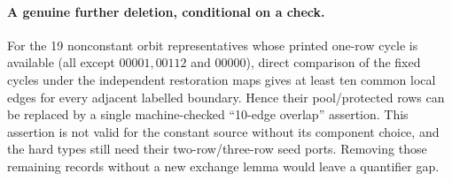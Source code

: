 \paragraph{A genuine further deletion, conditional on a check.}
For the 19 nonconstant orbit representatives whose printed one-row cycle
is available (all except $00001,00112$ and $00000$), direct comparison of
the fixed cycles under the independent restoration maps gives at least ten
common local edges for every adjacent labelled boundary.  Hence their
pool/protected rows can be replaced by a single machine-checked
``10-edge overlap'' assertion.  This assertion is not valid for the
constant source without its component choice, and the hard types still
need their two-row/three-row seed ports.  Removing those remaining records
without a new exchange lemma would leave a quantifier gap.
